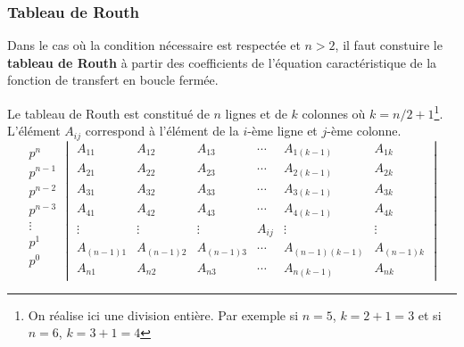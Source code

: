 \subsubsection{Tableau de Routh}
Dans le cas où la condition nécessaire est respectée et $n>2$, il faut constuire le \textbf{tableau de Routh}
à partir des coefficients de l'équation caractéristique de la fonction de transfert en boucle fermée.

Le tableau de Routh est constitué de $n$ lignes et de $k$ colonnes 
où $k=n/2+1$\footnote{On réalise ici une division entière. Par exemple 
si $n=5$, $k=2+1=3$ et si $n=6$, $k=3+1=4$}. L'élément $A_{ij}$ correspond 
à l'élément de la $i$-ème ligne et $j$-ème colonne.
\[
\begin{matrix}
    p^n    \\
    p^{n-1}\\
    p^{n-2}\\
    p^{n-3}\\
    \vdots \\
    p^1    \\
    p^0    \\
\end{matrix}
\begin{vmatrix}
    A_{11}     & A_{12}     & A_{13}     & \cdots & A_{1(k-1)}     & A_{1k}      \\
    A_{21}     & A_{22}     & A_{23}     & \cdots & A_{2(k-1)}     & A_{2k}      \\
    A_{31}     & A_{32}     & A_{33}     & \cdots & A_{3(k-1)}     & A_{3k}      \\
    A_{41}     & A_{42}     & A_{43}     & \cdots & A_{4(k-1)}     & A_{4k}      \\
    \vdots     & \vdots     & \vdots     & A_{ij} & \vdots         & \vdots      \\
    A_{(n-1)1} & A_{(n-1)2} & A_{(n-1)3} & \cdots & A_{(n-1)(k-1)} & A_{(n-1)k}  \\
    A_{n1}     & A_{n2}     & A_{n3}     & \cdots & A_{n(k-1)}     & A_{nk}
\end{vmatrix}
\]

